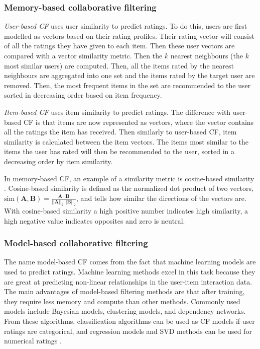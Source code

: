 \documentclass[english, 12pt, a4paper, sci, utf8, a-2b, online]{aaltothesis}
\begin{document}
\subsubsection{Memory-based collaborative filtering}
\label{subsubsec:memory_based_filtering}



\textit{User-based CF} uses user similarity to predict ratings. To do this, users are first modelled as vectors based on their rating profiles. Their rating vector will consist of all the ratings they have given to each item. Then these user vectors are compared with a vector similarity metric. Then the $k$ nearest neighbours (the $k$ most similar users) are computed. Then, all the items rated by the nearest neighbours are aggregated into one set and the items rated by the target user are removed. Then, the most frequent items in the set are recommended to the user sorted in decreasing order based on item frequency.



\textit{Item-based CF} uses item similarity to predict ratings. The difference with user-based CF is that items are now represented as vectors, where the vector contains all the ratings the item has received. Then similarly to user-based CF, item similarity is calculated between the item vectors. The items most similar to the items the user has rated will then be recommended to the user, sorted in a decreasing order by item similarity.

In memory-based CF, an example of a similarity metric is cosine-based similarity \parencite{su2009survey}. Cosine-based similarity is defined as the normalized dot product of two vectors, $\text{sim}(\mathbf{A}, \mathbf{B}) = \frac{\mathbf{A} \cdot \mathbf{B}}{||\mathbf{A}||_2 \, ||\mathbf{B}||_2}$, and tells how similar the directions of the vectors are. With cosine-based similarity a high positive number indicates high similarity, a high negative value indicates opposites and zero is neutral.

\subsubsection{Model-based collaborative filtering}
\label{subsubsec:model_based_filtering}

The name model-based CF comes from the fact that machine learning models are used to predict ratings. Machine learning methods excel in this task because they are great at predicting non-linear relationships in the user-item interaction data. The main advantages of model-based filtering methods are that after training, they require less memory and compute than other methods. Commonly used models include Bayesian models, clustering models, and dependency networks. From these algorithms, classification algorithms can be used as CF models if user ratings are categorical, and regression models and SVD methods can be used for numerical ratings \parencite{su2009survey}.
\end{document}
